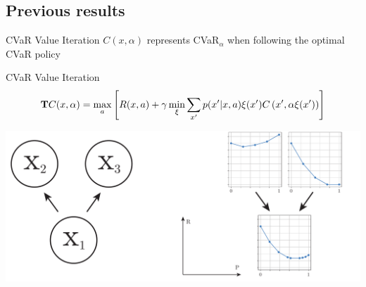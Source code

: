 \documentclass{beamer}
\begin{document}

\subsection{Previous results}

%


\begin{frame}{CVaR Value Iteration}
$C(x, \alpha)$ represents CVaR$_\alpha$ when following the optimal CVaR policy

\begin{block}{CVaR Value Iteration}
\vspace{-0.5cm}
$$\mathbf{T}C(x, \alpha) = \max_a \left[ { R(x, a) + \gamma \min_{\xi} \sum_{x'} p(x'| x, a)\xi(x') C\left( {x', \alpha\xi(x')} \right)} \right]$$
\end{block}


\center
\includegraphics[width=0.8\linewidth]{gfx/acvara_mixture.pdf}

\end{frame}
\end{document}
